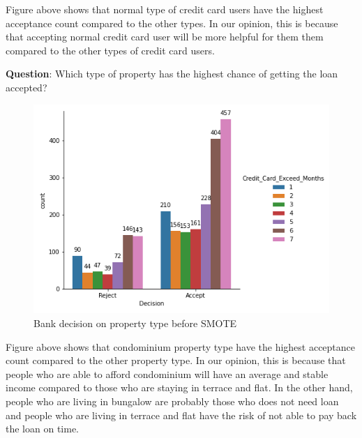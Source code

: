 \documentclass[11pt]{article}
\begin{document}
Figure above shows that normal type of credit card users have the highest acceptance count compared to the other types. In our opinion, this is because that accepting normal credit card user will be more helpful for them them compared to the other types of credit card users.
\clearpage

\noindent \textbf{Question}: Which type of property has the highest chance of getting the loan accepted?
\begin{figure}[h]
\centerline{\includegraphics[scale=0.8]{bSMOTE_dcs_property.png} }
\label{fig:bSmoteDCSproperty}
\caption{Bank decision on property type before SMOTE}
\end{figure}

Figure above shows that condominium property type have the highest acceptance count compared to the other property type. In our opinion, this is because that people who are able to afford condominium will have an average and stable income compared to those who are staying in terrace and flat. In the other hand, people who are living in bungalow are probably those who does not need loan and people who are living in terrace and flat have the risk of not able to pay back the loan on time.
\clearpage
\end{document}
